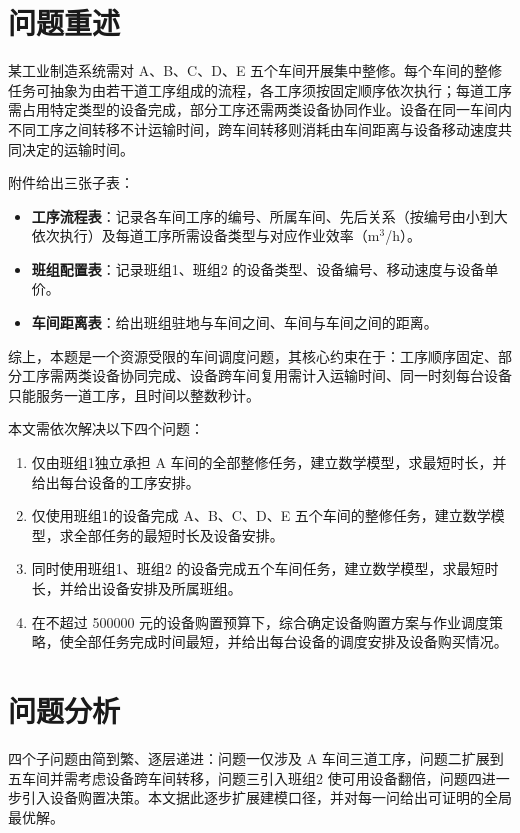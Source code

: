 \documentclass[12pt,a4paper]{article}
\begin{document}
\section{问题重述}

某工业制造系统需对 A、B、C、D、E 五个车间开展集中整修。每个车间的整修任务可抽象为由若干道工序组成的流程，各工序须按固定顺序依次执行；每道工序需占用特定类型的设备完成，部分工序还需两类设备协同作业。设备在同一车间内不同工序之间转移不计运输时间，跨车间转移则消耗由车间距离与设备移动速度共同决定的运输时间。

附件给出三张子表：

\begin{itemize}
  \item \textbf{工序流程表}：记录各车间工序的编号、所属车间、先后关系（按编号由小到大依次执行）及每道工序所需设备类型与对应作业效率（m$^3$/h）。
  \item \textbf{班组配置表}：记录班组1、班组2 的设备类型、设备编号、移动速度与设备单价。
  \item \textbf{车间距离表}：给出班组驻地与车间之间、车间与车间之间的距离。
\end{itemize}

综上，本题是一个资源受限的车间调度问题，其核心约束在于：工序顺序固定、部分工序需两类设备协同完成、设备跨车间复用需计入运输时间、同一时刻每台设备只能服务一道工序，且时间以整数秒计。

本文需依次解决以下四个问题：

\begin{enumerate}[label=\textbf{问题\,\arabic*：},leftmargin=2em]
  \item 仅由班组1独立承担 A 车间的全部整修任务，建立数学模型，求最短时长，并给出每台设备的工序安排。
  \item 仅使用班组1的设备完成 A、B、C、D、E 五个车间的整修任务，建立数学模型，求全部任务的最短时长及设备安排。
  \item 同时使用班组1、班组2 的设备完成五个车间任务，建立数学模型，求最短时长，并给出设备安排及所属班组。
  \item 在不超过 500000 元的设备购置预算下，综合确定设备购置方案与作业调度策略，使全部任务完成时间最短，并给出每台设备的调度安排及设备购买情况。
\end{enumerate}

\section{问题分析}

四个子问题由简到繁、逐层递进：问题一仅涉及 A 车间三道工序，问题二扩展到五车间并需考虑设备跨车间转移，问题三引入班组2 使可用设备翻倍，问题四进一步引入设备购置决策。本文据此逐步扩展建模口径，并对每一问给出可证明的全局最优解。
\end{document}
